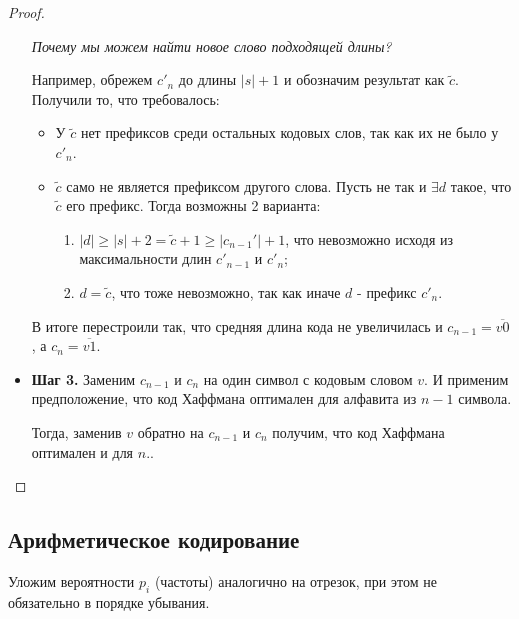 \begin{proof}
\begin{itemize}
		\textit{Почему мы можем найти новое слово подходящей длины?}
        
		Например, обрежем $ c'_n$ до длины $ \lvert s \rvert + 1$ и обозначим результат как $ \tilde c$. Получили то, что требовалось:
        \begin{itemize}
            \item У $ \tilde c$ нет префиксов среди остальных кодовых слов, так как их не было у $ c'_n$.
            \item $ \tilde c$ само не является префиксом другого слова. Пусть не так и $ \exists d$ такое, что $ \tilde c$ его префикс. Тогда возможны 2 варианта: 
            \begin{enumerate}
				\item  $ \lvert d \rvert \ge \lvert s \rvert + 2 = \tilde c + 1 \ge \lvert c_{n - 1}' \rvert + 1$, что невозможно исходя из максимальности длин $ c'_{n - 1}$ и $ c'_n$;
                \item $ d = \tilde c$, что тоже невозможно, так как иначе $ d$ - префикс $ c'_n$.
            \end{enumerate}
        \end{itemize} 




		В итоге перестроили так, что средняя длина кода не увеличилась и $c_{n-1} = \overline{v0}$, а $c_n = \overline{v1}$.
	\item \textbf{Шаг 3.} Заменим $c_{n-1}$ и $c_n$ на один символ с кодовым словом $v$.
		И применим предположение, что код Хаффмана оптимален для алфавита из $n-1$ символа.

		Тогда, заменив $v$ обратно на $c_{n - 1}$ и $c_n$ получим, что код Хаффмана оптимален и для $n$..
\end{itemize}
\end{proof}

\subsection{Арифметическое кодирование}
Уложим вероятности $p_i$ (частоты) аналогично на отрезок, при этом не обязательно в порядке убывания.

